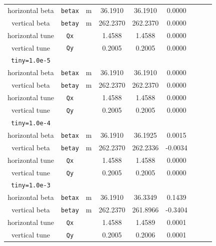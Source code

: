 \documentclass[12pt]{article}
\begin{document}
\begin{table}[h]
\begin{tabular}{|c|c|c|c|c|c|c|c|c|}
horizontal beta   & {\tt betax}       &  m    &      36.1910  &  36.1910      & 0.0000        \\
vertical beta     & {\tt betay}       &  m    &    262.2370   &  262.2370     & 0.0000        \\
horizontal tune   &  {\tt Qx}         &       &      1.4588   &  1.4588       & 0.0000        \\ 
vertical tune     &  {\tt Qy}         &       &     0.2005    &  0.2005       & 0.0000        \\ \hline
{\tt tiny=1.0e-5} &                   &       &               &               &          \\ \hline
horizontal beta   & {\tt betax}       &  m    &     36.1910   &  36.1910      & 0.0000  \\
vertical beta     & {\tt betay}       &  m    &    262.2370   &  262.2370     & 0.0000  \\ 
horizontal tune   &  {\tt Qx}         &       &      1.4588   &   1.4588      & 0.0000  \\ 
vertical tune     &  {\tt Qy}         &       &     0.2005    &   0.2005      & 0.0000  \\ \hline  
{\tt tiny=1.0e-4} &                   &       &               &               &          \\ \hline
horizontal beta   & {\tt betax}       &  m    &     36.1910   &  36.1925      &  0.0015  \\
vertical beta     & {\tt betay}       &  m    &   262.2370    &  262.2336     & -0.0034       \\
horizontal tune   &  {\tt Qx}         &       &      1.4588   &    1.4588     &  0.0000       \\ 
vertical tune     &  {\tt Qy}         &       &     0.2005    &    0.2005     &  0.0000  \\ \hline
{\tt tiny=1.0e-3} &                   &       &               &               &          \\ \hline
horizontal beta   & {\tt betax}       &  m    &      36.1910  &  36.3349      &  0.1439  \\
vertical beta     & {\tt betay}       &  m    &    262.2370   &  261.8966     & -0.3404 \\
horizontal tune   &  {\tt Qx}         &       &      1.4588   &  1.4589       &  0.0001 \\ 
vertical tune     &  {\tt Qy}         &       &     0.2005    &  0.2006       &  0.0001  \\ \hline
\end{tabular}
\end{table}
%
\end{document}

